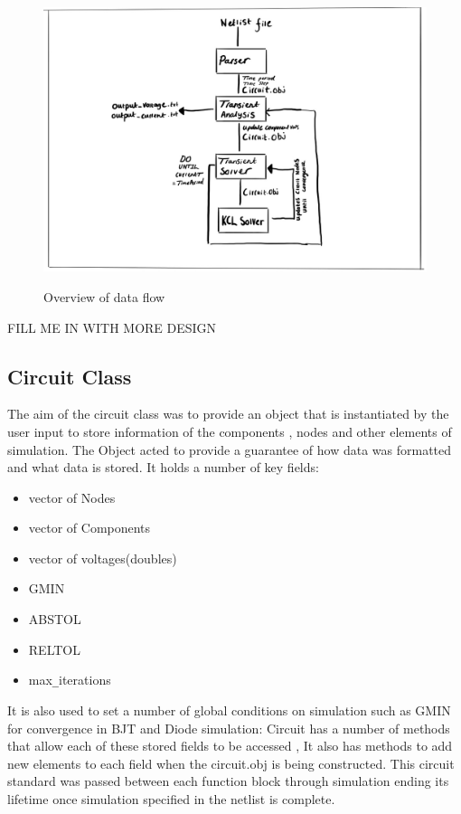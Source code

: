 \documentclass{article}
\begin{document}
\begin{figure}[h]
    \caption{Overview of data flow}
    \centering
    \includegraphics[width=\textwidth]{images/Comphpp.jpg}
    \label{fig:AlgoOverview}
\end{figure}

FILL ME IN WITH MORE DESIGN

\newpage
\subsection{Circuit Class}
The aim of the circuit class was to provide an object that is instantiated by the user input to store information of the components , nodes and other elements of simulation. The Object acted to provide a guarantee of how data was formatted and what data is stored. It holds a number of key fields:
\medbreak
\noindent\begin{minipage}{.5\linewidth}
\begin{itemize}
    \item vector of Nodes
    \item vector of Components
    \item vector of voltages(doubles)
\end{itemize}
\end{minipage}%
\begin{minipage}{.5\linewidth}
\begin{itemize}\break
    \item GMIN
    \item ABSTOL
    \item RELTOL
    \item max\verb|_|iterations
\end{itemize}
\end{minipage}
\medbreak
It is also used to set a number of global conditions on simulation such as GMIN for convergence in BJT and Diode simulation:
\medbreak
Circuit has a number of methods that allow each of these stored fields to be accessed , It also has methods to add new elements to each field when the circuit.obj is being constructed. This circuit standard was passed between each function block through simulation ending its lifetime once simulation specified in the netlist is complete.
\end{document}
